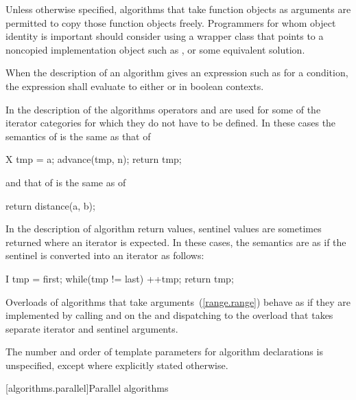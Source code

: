 \pnum
\begin{note}
Unless otherwise specified, algorithms that take function objects as arguments
are permitted to copy those function objects freely. Programmers for whom object
identity is important should consider using a wrapper class that points to a
noncopied implementation object such as , or some equivalent solution.
\end{note}

\pnum
When the description of an algorithm gives an expression such as
for a condition, the expression shall evaluate to
either  or  in boolean contexts.

\pnum
In the description of the algorithms operators
\tcode{+}
and
\tcode{-}
are used for some of the iterator categories for which
they do not have to be defined.
In these cases the semantics of
is the same as that of

\begin{codeblock}
X tmp = a;
advance(tmp, n);
return tmp;
\end{codeblock}

and that of
is the same as of

\begin{codeblock}
return distance(a, b);
\end{codeblock}

\begin{addedblock}
\pnum
In the description of algorithm return values, sentinel values are sometimes
returned where an iterator is expected. In these cases, the semantics are as
if the sentinel is converted into an iterator as follows:

\begin{codeblock}
I tmp = first;
while(tmp != last)
  ++tmp;
return tmp;
\end{codeblock}

\pnum
Overloads of algorithms that take  arguments~(\ref{range.range})
behave as if they are implemented by calling  and  on
the  and dispatching to the overload that takes separate
iterator and sentinel arguments.

\pnum
The number and order of template parameters for algorithm declarations
is unspecified, except where explicitly stated otherwise.
\end{addedblock}

[algorithms.parallel]{Parallel algorithms}

